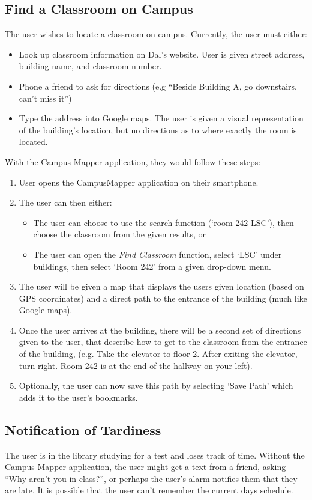 \documentclass{article}
\begin{document}
\subsection{Find a Classroom on Campus}
The user wishes to locate a classroom on campus. Currently, the user must either:
\begin{itemize}
\item Look up classroom information on Dal's website.  User is given street
address, building name, and classroom number. 
\item Phone a friend to ask for directions (e.g ``Beside Building A, go
downstairs, can't miss it'')
\item Type the address into Google maps. The user is given a visual
representation of the building's location, but no directions as to where exactly
the room is located. 
\end{itemize}

With the Campus Mapper application, they would follow these steps:
\begin{enumerate}
\item User opens the CampusMapper application on their smartphone. 
\item The user can then either:
    \begin{itemize}
    \item The user can choose to use the search function (`room 242 LSC'), then
    choose the classroom from the given results, or
    \item The user can open the \emph{Find Classroom} function, select `LSC' under
    buildings, then select `Room 242' from a given drop-down menu.
    \end{itemize}
\item The user will be given a map that displays the users given location (based on
GPS coordinates) and a direct path to the entrance of the building (much like
Google maps).
\item Once the user arrives at the building, there will be a second set of
directions given to the user, that describe how to get to the classroom from the
entrance of the building, (e.g. Take the elevator to floor 2. After exiting the
elevator, turn right. Room 242 is at the end of the hallway on your left).
\item Optionally, the user can now save this path by selecting `Save Path' which
adds it to the user's bookmarks.
\end{enumerate}

\subsection{Notification of Tardiness}
The user is in the library studying for a test and loses track of time. Without
the Campus Mapper application, the user might get a text from a friend, asking
``Why aren't you in class?'', or perhaps the user's alarm notifies them that they
are late. It is possible that the user can't remember the current days schedule.
\end{document}
